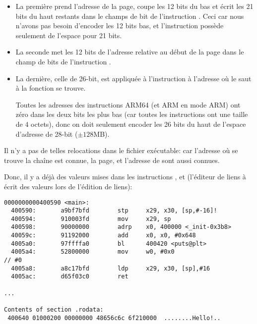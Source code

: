 \begin{itemize}
\item 
La première prend l'adresse de la page, coupe les 12 bits du bas et écrit les 21 bits
du haut restants dans le champs de bit de l'instruction . Ceci car nous n'avons
pas besoin d'encoder les 12 bits bas, et l'instruction  possède seulement
de l'espace pour 21 bits.

\item 
La seconde met les 12 bits de l'adresse relative au début de la page dans le champ
de bits de l'instruction \ADD.

\item 
La dernière, celle de 26-bit, est appliquée à l'instruction à l'adresse 
où le saut à la fonction \printf se trouve.

Toutes les adresses des instructions ARM64 (et ARM en mode ARM) ont zéro dans les
deux bits les plus bas (car toutes les instructions ont une taille de 4 octets),
donc on doit seulement encoder les 26 bits du haut de l'espace d'adresse de 28-bit
($\pm 128$MB).

\end{itemize}

Il n'y a pas de telles relocations dans le fichier exécutable: car l'adresse où se
trouve la chaîne  est connue, la page, et l'adresse de \puts sont aussi
connues.

Donc, il y a déjà des valeurs mises dans les instructions , \ADD et 
(l'éditeur de liens à écrit des valeurs lors de l'édition de liens):

\begin{lstlisting}[caption=objdump du fichier exécutable,style=customasmARM]
0000000000400590 <main>:
  400590:       a9bf7bfd        stp     x29, x30, [sp,#-16]!
  400594:       910003fd        mov     x29, sp
  400598:       90000000        adrp    x0, 400000 <_init-0x3b8>
  40059c:       91192000        add     x0, x0, #0x648
  4005a0:       97ffffa0        bl      400420 <puts@plt>
  4005a4:       52800000        mov     w0, #0x0                        // #0
  4005a8:       a8c17bfd        ldp     x29, x30, [sp],#16
  4005ac:       d65f03c0        ret

...

Contents of section .rodata:
 400640 01000200 00000000 48656c6c 6f210000  ........Hello!..
\end{lstlisting}


